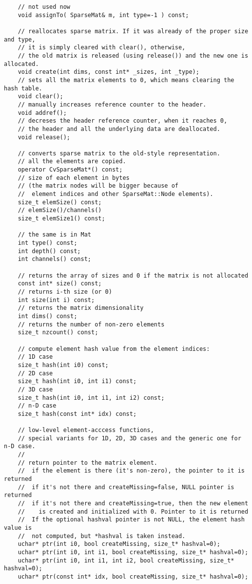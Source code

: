 \begin{lstlisting}
    // not used now
    void assignTo( SparseMat& m, int type=-1 ) const;

    // reallocates sparse matrix. If it was already of the proper size and type,
    // it is simply cleared with clear(), otherwise,
    // the old matrix is released (using release()) and the new one is allocated.
    void create(int dims, const int* _sizes, int _type);
    // sets all the matrix elements to 0, which means clearing the hash table.
    void clear();
    // manually increases reference counter to the header.
    void addref();
    // decreses the header reference counter, when it reaches 0,
    // the header and all the underlying data are deallocated.
    void release();

    // converts sparse matrix to the old-style representation.
    // all the elements are copied.
    operator CvSparseMat*() const;
    // size of each element in bytes
    // (the matrix nodes will be bigger because of
    //  element indices and other SparseMat::Node elements).
    size_t elemSize() const;
    // elemSize()/channels()
    size_t elemSize1() const;
    
    // the same is in Mat
    int type() const;
    int depth() const;
    int channels() const;
    
    // returns the array of sizes and 0 if the matrix is not allocated
    const int* size() const;
    // returns i-th size (or 0)
    int size(int i) const;
    // returns the matrix dimensionality
    int dims() const;
    // returns the number of non-zero elements
    size_t nzcount() const;
    
    // compute element hash value from the element indices:
    // 1D case
    size_t hash(int i0) const;
    // 2D case
    size_t hash(int i0, int i1) const;
    // 3D case
    size_t hash(int i0, int i1, int i2) const;
    // n-D case
    size_t hash(const int* idx) const;
    
    // low-level element-acccess functions,
    // special variants for 1D, 2D, 3D cases and the generic one for n-D case.
    //
    // return pointer to the matrix element.
    //  if the element is there (it's non-zero), the pointer to it is returned
    //  if it's not there and createMissing=false, NULL pointer is returned
    //  if it's not there and createMissing=true, then the new element
    //    is created and initialized with 0. Pointer to it is returned
    //  If the optional hashval pointer is not NULL, the element hash value is
    //  not computed, but *hashval is taken instead.
    uchar* ptr(int i0, bool createMissing, size_t* hashval=0);
    uchar* ptr(int i0, int i1, bool createMissing, size_t* hashval=0);
    uchar* ptr(int i0, int i1, int i2, bool createMissing, size_t* hashval=0);
    uchar* ptr(const int* idx, bool createMissing, size_t* hashval=0);


\end{lstlisting}
